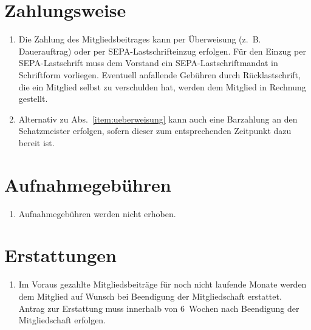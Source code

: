 \documentclass[a4paper,12pt]{scrartcl}
\begin{document}
\section{Zahlungsweise}
\begin{enumerate}
  \item\label{item:ueberweisung} Die Zahlung des Mitgliedsbeitrages kann per
    Überweisung (z.~B. Dauerauftrag) oder per SEPA-Lastschrifteinzug erfolgen.
    Für den Einzug per SEPA-Lastschrift muss dem Vorstand ein
    SEPA-Lastschriftmandat in Schriftform vorliegen. Eventuell anfallende
    Gebühren durch Rücklastschrift, die ein Mitglied selbst zu verschulden hat,
    werden dem Mitglied in Rechnung gestellt.
  \item Alternativ zu Abs.~\ref{item:ueberweisung} kann auch eine Barzahlung an
    den Schatzmeister erfolgen, sofern dieser zum entsprechenden Zeitpunkt dazu
    bereit ist.
\end{enumerate}

\section{Aufnahmegebühren}
\begin{enumerate}
  \item Aufnahmegebühren werden nicht erhoben.
\end{enumerate}

\section{Erstattungen}
\begin{enumerate}
  \item Im Voraus gezahlte Mitgliedsbeiträge für noch nicht laufende Monate
    werden dem Mitglied auf Wunsch bei Beendigung der Mitgliedschaft erstattet.
    Antrag zur Erstattung muss innerhalb von 6~Wochen nach Beendigung der
    Mitgliedschaft erfolgen.
\end{enumerate}
\end{document}
